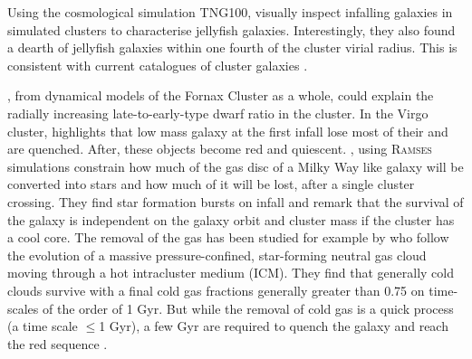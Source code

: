 Using the cosmological simulation TNG100, \citet{Yun2018} visually inspect infalling galaxies in simulated clusters to characterise jellyfish galaxies.
Interestingly, they also found a dearth of jellyfish galaxies within one fourth of the cluster virial radius.
This is consistent with current catalogues of cluster galaxies \citep{Lisker2006, Venhola2019}.


\citet{DeRijcke2010}, from dynamical models of the Fornax Cluster as a whole, could explain the radially increasing late-to-early-type dwarf ratio in the cluster.
In the Virgo cluster, \citet{Boselli2008} highlights that low mass galaxy at the first infall lose most of their \Hi{} and are quenched.
After, these objects become red and quiescent.
\citet{Ruggiero2017}, using \textsc{Ramses} simulations constrain how much of the gas disc of a Milky Way like galaxy will be converted into stars and how much of it will be lost, after a single cluster crossing.
They find star formation bursts on infall and remark that the survival of the galaxy is independent on the galaxy orbit and cluster mass if the cluster has a cool core.
The removal of the gas has been studied for example by \cite{Calura2020} who follow the evolution of a massive pressure-confined, star-forming neutral gas cloud moving through a hot intracluster medium (ICM).
They find that generally cold clouds survive with a final cold gas fractions generally greater than 0.75 on time-scales of the order of 1 Gyr.
But while the removal of cold gas is a quick process (a time scale $\leq$1 Gyr), a few Gyr are required to quench the galaxy and reach the red sequence \citep{Cortese2009}.


